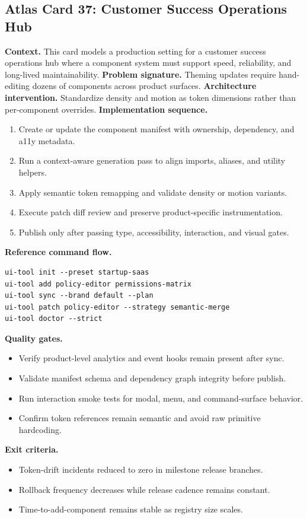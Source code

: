 \subsection*{Atlas Card 37: Customer Success Operations Hub}
\textbf{Context.} This card models a production setting for a customer success operations hub where a component system must support speed, reliability, and long-lived maintainability.
\textbf{Problem signature.} Theming updates require hand-editing dozens of components across product surfaces.
\textbf{Architecture intervention.} Standardize density and motion as token dimensions rather than per-component overrides.
\textbf{Implementation sequence.}
\begin{enumerate}[leftmargin=*, itemsep=0.28em]
  \item Create or update the component manifest with ownership, dependency, and a11y metadata.
  \item Run a context-aware generation pass to align imports, aliases, and utility helpers.
  \item Apply semantic token remapping and validate density or motion variants.
  \item Execute patch diff review and preserve product-specific instrumentation.
  \item Publish only after passing type, accessibility, interaction, and visual gates.
\end{enumerate}
\textbf{Reference command flow.}
\begin{verbatim}
ui-tool init --preset startup-saas
ui-tool add policy-editor permissions-matrix
ui-tool sync --brand default --plan
ui-tool patch policy-editor --strategy semantic-merge
ui-tool doctor --strict
\end{verbatim}
\textbf{Quality gates.}
\begin{itemize}[leftmargin=*, itemsep=0.24em]
  \item Verify product-level analytics and event hooks remain present after sync.
  \item Validate manifest schema and dependency graph integrity before publish.
  \item Run interaction smoke tests for modal, menu, and command-surface behavior.
  \item Confirm token references remain semantic and avoid raw primitive hardcoding.
\end{itemize}
\textbf{Exit criteria.}
\begin{itemize}[leftmargin=*, itemsep=0.24em]
  \item Token-drift incidents reduced to zero in milestone release branches.
  \item Rollback frequency decreases while release cadence remains constant.
  \item Time-to-add-component remains stable as registry size scales.
\end{itemize}
\clearpage
